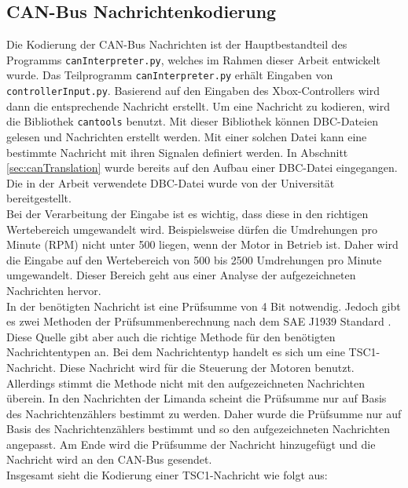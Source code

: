 \subsection{CAN-Bus Nachrichtenkodierung} \label{sec:canBus}
Die Kodierung der CAN-Bus Nachrichten ist der Hauptbestandteil des Programms \texttt{canInterpreter.py}, welches im Rahmen dieser Arbeit
entwickelt wurde. 
Das Teilprogramm \texttt{canInterpreter.py} erhält Eingaben von \texttt{controllerInput.py}. Basierend auf den
Eingaben des Xbox-Controllers wird dann die entsprechende Nachricht erstellt. Um eine Nachricht zu kodieren, wird die Bibliothek \texttt{cantools} benutzt.
Mit dieser Bibliothek können DBC-Dateien gelesen und Nachrichten erstellt werden. Mit einer solchen Datei kann eine
bestimmte Nachricht mit ihren Signalen definiert werden. In Abschnitt \ref{sec:canTranslation} wurde bereits auf den
Aufbau einer DBC-Datei eingegangen. Die in der Arbeit verwendete DBC-Datei wurde von der Universität bereitgestellt. \\
Bei der Verarbeitung der Eingabe ist es wichtig, dass diese in den richtigen Wertebereich umgewandelt wird.
Beispielsweise dürfen die Umdrehungen pro Minute (RPM) nicht unter 500 liegen, wenn der Motor in Betrieb ist.
Daher wird die Eingabe auf den Wertebereich von 500 bis 2500 Umdrehungen pro Minute umgewandelt. Dieser Bereich
geht aus einer Analyse der aufgezeichneten Nachrichten hervor.
\\
In der benötigten Nachricht ist eine Prüfsumme von 4 Bit notwendig. Jedoch gibt es zwei Methoden der Prüfsummenberechnung
nach dem SAE J1939 Standard \cite{VectorSAE}. Diese Quelle gibt aber auch die richtige Methode für den benötigten Nachrichtentypen
an. Bei dem Nachrichtentyp handelt es sich um eine TSC1-Nachricht. Diese Nachricht wird für die Steuerung der Motoren
benutzt. Allerdings stimmt die Methode nicht mit den aufgezeichneten Nachrichten überein. In den Nachrichten der Limanda
scheint die Prüfsumme nur auf Basis des Nachrichtenzählers bestimmt zu werden. Daher wurde die Prüfsumme nur auf Basis des Nachrichtenzählers
bestimmt und so den aufgezeichneten Nachrichten angepasst.
Am Ende wird die Prüfsumme der Nachricht hinzugefügt und die
Nachricht wird an den CAN-Bus gesendet. \\
Insgesamt sieht die Kodierung einer TSC1-Nachricht wie folgt aus:
